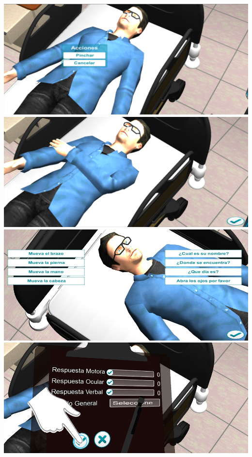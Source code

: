 \begin{frame}
\begin{overprint}
 \includegraphics[width=\textwidth]{imagenes/flujo/flujo13.png}
 \includegraphics[width=\textwidth]{imagenes/flujo/flujo14.png}
 \includegraphics[width=\textwidth]{../solucion/images/glasgow_comandos_voz.jpg}
 \includegraphics[width=\textwidth]{imagenes/flujo/flujo16.png}

\end{overprint}
\end{frame}

